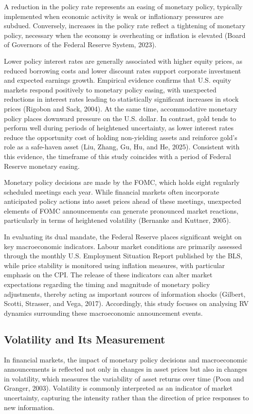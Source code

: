 \documentclass[12pt,a4paper]{report}
\begin{document}
A reduction in the policy rate represents an easing of monetary policy, typically implemented when economic activity is weak or inflationary pressures are subdued. Conversely, increases in the policy rate reflect a tightening of monetary policy, necessary when the economy is overheating or inflation is elevated (Board of Governors of the Federal Reserve System, 2023).

Lower policy interest rates are generally associated with higher equity prices, as reduced borrowing costs and lower discount rates support corporate investment and expected earnings growth. Empirical evidence confirms that U.S. equity markets respond positively to monetary policy easing, with unexpected reductions in interest rates leading to statistically significant increases in stock prices (Rigobon and Sack, 2004). At the same time, accommodative monetary policy places downward pressure on the U.S. dollar. In contrast, gold tends to perform well during periods of heightened uncertainty, as lower interest rates reduce the opportunity cost of holding non-yielding assets and reinforce gold's role as a safe-haven asset (Liu, Zhang, Gu, Hu, and He, 2025). Consistent with this evidence, the timeframe of this study coincides with a period of Federal Reserve monetary easing.

Monetary policy decisions are made by the FOMC, which holds eight regularly scheduled meetings each year. While financial markets often incorporate anticipated policy actions into asset prices ahead of these meetings, unexpected elements of FOMC announcements can generate pronounced market reactions, particularly in terms of heightened volatility (Bernanke and Kuttner, 2005).

In evaluating its dual mandate, the Federal Reserve places significant weight on key macroeconomic indicators. Labour market conditions are primarily assessed through the monthly U.S. Employment Situation Report published by the BLS, while price stability is monitored using inflation measures, with particular emphasis on the CPI. The release of these indicators can alter market expectations regarding the timing and magnitude of monetary policy adjustments, thereby acting as important sources of information shocks (Gilbert, Scotti, Strasser, and Vega, 2017). Accordingly, this study focuses on analysing RV dynamics surrounding these macroeconomic announcement events.

\subsection{Volatility and Its Measurement}
In financial markets, the impact of monetary policy decisions and macroeconomic announcements is reflected not only in changes in asset prices but also in changes in volatility, which measures the variability of asset returns over time (Poon and Granger, 2003). Volatility is commonly interpreted as an indicator of market uncertainty, capturing the intensity rather than the direction of price responses to new information.
\end{document}
